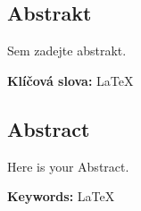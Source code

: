 
\newpage
\subsection*{Abstrakt}
Sem zadejte abstrakt.

\noindent %
\textbf{Klíčová slova:} \LaTeX

\subsection*{Abstract}
Here is your Abstract.

\noindent
\textbf{Keywords:}  \LaTeX